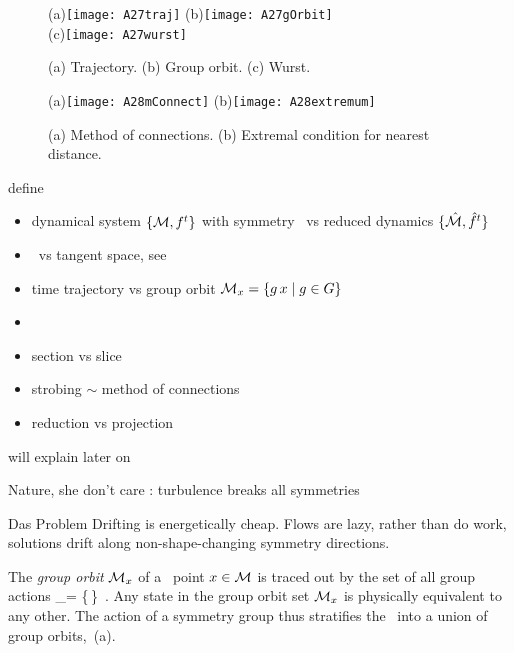 \begin{figure}
   \centering
(a)\texttt{[image: A27traj]}
(b)\texttt{[image: A27gOrbit]}
    \\
(c)\texttt{[image: A27wurst]}
   \caption{\label{fig:A27wurst}
    (a)
Trajectory.
    (b)
Group orbit.
    (c)
Wurst.
}
\end{figure}

\begin{figure}
   \centering
(a)\texttt{[image: A28mConnect]}
(b)\texttt{[image: A28extremum]}
   \caption{\label{fig:A28extremum}
    (a)
Method of connections.
    (b)
Extremal condition for nearest distance.
}
\end{figure}


define
\begin{itemize}
  \item dynamical system $\{{\cal M},f^t\}$ with symmetry \Group\
        vs reduced dynamics $\{\hat{\cal M},\hat{f}^t\}$
  \item \statesp\ vs tangent space, see 
  \item time trajectory \flowRed{\zeit}{\ssp} vs group orbit
        ${\cal M}_{x} = \{g\,x \mid g \in {\ensuremath{G}}\}$
  \item \template
  \item section {\PoincS} vs slice \pSRed
  \item strobing $\sim$ method of connections
  \item reduction vs projection
\end{itemize}
will explain later on

Nature, she don't care :
turbulence breaks all symmetries

{\Large Das Problem}
Drifting is energetically cheap.
Flows are lazy, rather than do work, solutions drift along non-shape-changing
symmetry directions.

    \color{black}\fi

The \emph{group orbit} ${\cal M}_{x} $ of a \statesp\ point $x \in {\cal M}$ is
traced out by the set of all group actions
\beq
\pS_\ssp = \{\LieEl\,\ssp \mid \LieEl \in {\Group}\}
\,.
Any state in the  group orbit set ${\cal M}_{x}$
is physically equivalent to any other. The action of a symmetry group
thus stratifies the \statesp\ into a union of group orbits,
\,{(a)}.

